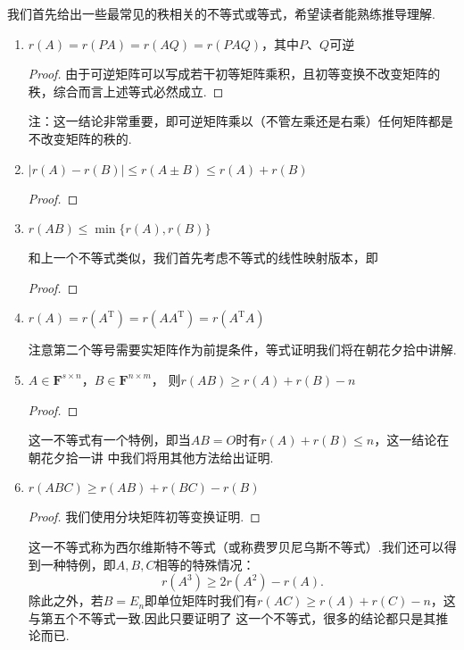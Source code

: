我们首先给出一些最常见的秩相关的不等式或等式，希望读者能熟练推导理解.
\begin{enumerate}
    \item $r(A)=r(PA)=r(AQ)=r(PAQ)$，其中$P$、$Q$可逆

    \begin{proof}
        由于可逆矩阵可以写成若干初等矩阵乘积，且初等变换不改变矩阵的秩，综合而言上述等式必然成立.
    \end{proof}

    注：这一结论非常重要，即可逆矩阵乘以（不管左乘还是右乘）任何矩阵都是不改变矩阵的秩的.

    \item $|r(A)-r(B)|\leqslant r(A\pm B) \leqslant r(A)+r(B)$

    \begin{proof}

    \end{proof}
    \item $r(AB) \leqslant \min\{r(A), r(B)\}$

    和上一个不等式类似，我们首先考虑不等式的线性映射版本，即

    \begin{proof}

    \end{proof}
    \item $r(A)=r(A^\mathrm{T})=r(AA^\mathrm{T})=r(A^\mathrm{T}A)$

    注意第二个等号需要实矩阵作为前提条件，等式证明我们将在朝花夕拾中讲解.

    \item $A \in \mathbf{F}^{s \times n}$，$B \in \mathbf{F}^{n \times m}$，
    则$r(AB) \geqslant r(A)+r(B)-n$

    \begin{proof}

    \end{proof}

    这一不等式有一个特例，即当$AB=O$时有$r(A)+r(B)\leqslant n$，这一结论在朝花夕拾一讲
    中我们将用其他方法给出证明.

    \item $r(ABC) \geqslant r(AB)+r(BC)-r(B)$

    \begin{proof}
        我们使用分块矩阵初等变换证明.
    \end{proof}

    这一不等式称为西尔维斯特不等式（或称费罗贝尼乌斯不等式）.我们还可以得到一种特例，即$A,B,C$相等的特殊情况：
    \[r(A^3) \geqslant 2r(A^2)-r(A).\]
    除此之外，若$B=E_n$即单位矩阵时我们有$r(AC) \geqslant r(A)+r(C)-n$，这与第五个不等式一致.因此只要证明了
    这一个不等式，很多的结论都只是其推论而已.
\end{enumerate}

